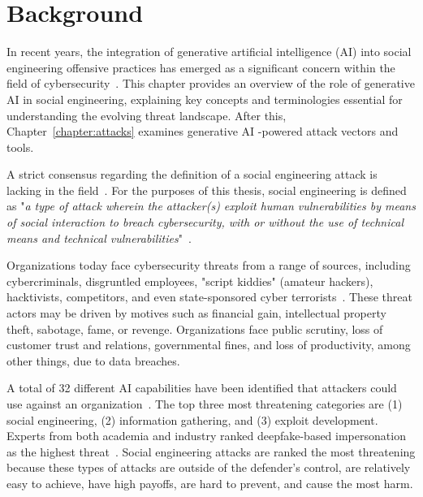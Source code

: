 \chapter{Background\label{chapter:background}}
\begin{comment}
\end{comment}


%
%
In recent years, the integration of generative artificial intelligence (AI) into social engineering offensive practices has emerged as a significant concern within the field of cybersecurity~\citep{blauth_AI_Crime_Overview_Malicious_Use_Abuse_2022, king_AI_Crime_Interdisciplinary_Analysis_2019, mirsky_Threat_Offensive_AI_Organizations_2023}. This chapter provides an overview of the role of generative AI in social engineering, explaining key concepts and terminologies essential for understanding the evolving threat landscape. After this, Chapter~\ref{chapter:attacks} examines generative AI -powered attack vectors and tools.



%
%
A strict consensus regarding the definition of a social engineering attack is lacking in the field~\citep{hatfield_SE_Evolution_Concept_2018}. For the purposes of this thesis, social engineering is defined as "\textit{a type of attack wherein the attacker(s) exploit human vulnerabilities by means of social interaction to breach cybersecurity, with or without the use of technical means and technical vulnerabilities}"~\citep{wang_Defining_Social_Engineering_2020}.



%
%
Organizations today face cybersecurity threats from a range of sources, including cybercriminals, disgruntled employees, "script kiddies" (amateur hackers), hacktivists, competitors, and even state-sponsored cyber terrorists~\citep{mirsky_Threat_Offensive_AI_Organizations_2023}. These threat actors may be driven by motives such as financial gain, intellectual property theft, sabotage, fame, or revenge. Organizations face public scrutiny, loss of customer trust and relations, governmental fines, and loss of productivity, among other things, due to data breaches.


%
%
A total of 32 different AI capabilities have been identified that attackers could use against an organization~\citep{mirsky_Threat_Offensive_AI_Organizations_2023}. The top three most threatening categories are (1) social engineering, (2) information gathering, and (3) exploit development. Experts from both academia and industry ranked deepfake-based impersonation as the highest threat~\citep{mirsky_Threat_Offensive_AI_Organizations_2023}. Social engineering attacks are ranked the most threatening because these types of attacks are outside of the defender's control, are relatively easy to achieve, have high payoffs, are hard to prevent, and cause the most harm.



